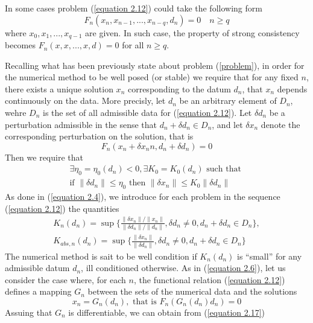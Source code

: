 In some cases problem (\ref{equation 2.12}) could take the following form
\begin{equation}
    F_n (x_n, x_{n-1}, ..., x_{n-q}, d_n) = 0 \quad n \geq q
    \label{equation 2.14}
\end{equation}
where $x_0, x_1, ..., x_{q-1}$ are given. In such case, the property of strong consistency becomes $F_n(x, x, ..., x, d) = 0$ for all $n \geq q$.

Recalling what has been previously state about problem (\ref{problem}), in order for the numerical method to be well posed (or stable) we require that for any fixed $n$, there exists a unique solution $x_n$ corresponding to the datum $d_n$, that $x_n$ depends continuously on the data. More precisly, let $d_n$ be an arbitrary element of $D_n$, wehre $D_n$ is the set of all admissible data for (\ref{equation 2.12}). Let $\delta d_n$ be a perturbation admissible in the sense that $d_n + \delta d_n \in D_n$, and let $\delta x_n$ denote the corresponding perturbation on the solution, that is 
\[F_n(x_n + \delta x_nn, d_n + \delta d_n) = 0\]
Then we require that
\begin{multline}
    \exists \eta_0 = \eta_0 (d_n) < 0, \exists K_0 = K_0 (d_n) \text{ such that } \\
    \text{if } \| \delta d_n \| \leq \eta_0 \text{ then } \| \delta x_n \| \leq K_0 \| \delta d_n \|
    \label{equation 2.16}
\end{multline}
As done in (\ref{equation 2.4}), we introduce for each problem in the sequence (\ref{equation 2.12}) the quantities
\begin{multline}
    K_n (d_n) = \sup\{\frac{\| \delta x_n\| / \| x_n \|}{ \| \delta d_n \| / \| d_n \|}, \delta d_n \neq 0, d_n + \delta d_n \in D_n\}, \\
    K_{abs, n}(d_n) = \sup\{\frac{\| \delta x_n \|}{ \| \delta d_n \|}, \delta d_n \neq 0, d_n + \delta d_n \in D_n\}
    \label{equation 2.17}
\end{multline}
The numerical method is sait to be well condition if $K_n(d_n)$ is ``small'' for any admissible datum $d_n$, ill conditioned otherwise. As in (\ref{equation 2.6}), let us consider the case where, for each $n$, the functional relation (\ref{equation 2.12}) defines a mapping $G_n$ between the sets of the numerical data and the solutions
\begin{equation}
    x_n = G_n(d_n), \text{ that is } F_n (G_n(d_n) d_n) = 0
    \label{equation 2.18}
\end{equation}
Assuing that $G_n$ is differentiable, we can obtain from (\ref{equation 2.17})
